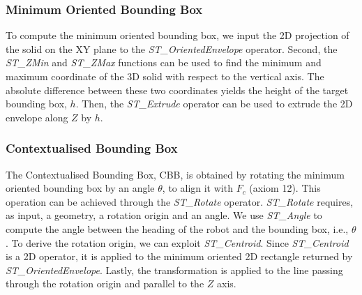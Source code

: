 \documentclass{article}
\begin{document}
\subsubsection{Minimum Oriented Bounding Box} To compute the minimum oriented bounding box, we input the 2D projection of the solid on the XY plane to the \textit{ST\_OrientedEnvelope} operator. Second, the \textit{ST\_ZMin} and \textit{ST\_ZMax} functions can be used to find the minimum and maximum coordinate of the 3D solid with respect to the vertical axis. The absolute difference between these two coordinates yields the height of the target bounding box, $h$. Then, the \textit{ST\_Extrude} operator can be used to extrude the 2D envelope along $Z$ by $h$. %
\subsubsection{Contextualised Bounding Box} The Contextualised Bounding Box, CBB, is obtained by rotating the minimum oriented bounding box by an angle $\theta$, to align it with $F_c$ (axiom 12). This operation can be achieved through the \textit{ST\_Rotate} operator. \textit{ST\_Rotate} requires, as input, a geometry, a rotation origin and an angle. We use \textit{ST\_Angle} to compute the angle between the heading of the robot and the bounding box, i.e., $\theta$. To derive the rotation origin, we can exploit \textit{ST\_Centroid}. Since \textit{ST\_Centroid} is a 2D operator, it is applied to the minimum oriented 2D rectangle returned by \textit{ST\_OrientedEnvelope}. Lastly, the transformation is applied to the line passing through the rotation origin and parallel to the $Z$ axis.
\end{document}
